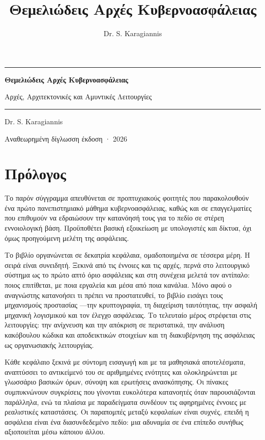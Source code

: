 \documentclass[11pt,openany]{book}
\title{Θεμελιώδεις Αρχές Κυβερνοασφάλειας}
\author{Dr. S. Karagiannis}
\begin{document}
\frontmatter
\begin{titlepage}
  \centering\sffamily
  \vspace*{3cm}
  {\color{accent}\rule{\linewidth}{1.2pt}}\par\vspace{1cm}
  {\Huge\bfseries Θεμελιώδεις Αρχές Κυβερνοασφάλειας\par}
  \vspace{0.6cm}
  {\Large Αρχές, Αρχιτεκτονικές και Αμυντικές Λειτουργίες\par}
  \vspace{1cm}
  {\color{accent}\rule{\linewidth}{1.2pt}}\par
  \vfill
  {\large Dr. S. Karagiannis\par}
  \vspace{0.3cm}
  {\small Αναθεωρημένη δίγλωσση έκδοση · 2026\par}
\end{titlepage}
\tableofcontents
\chapter*{Πρόλογος}

Το παρόν σύγγραμμα απευθύνεται σε προπτυχιακούς φοιτητές που παρακολουθούν ένα πρώτο πανεπιστημιακό μάθημα κυβερνοασφάλειας, καθώς και σε επαγγελματίες που επιθυμούν να εδραιώσουν την κατανόησή τους για το πεδίο σε στέρεη εννοιολογική βάση. Προϋποθέτει βασική εξοικείωση με υπολογιστές και δίκτυα, όχι όμως προηγούμενη μελέτη της ασφάλειας.

Το βιβλίο οργανώνεται σε δεκατρία κεφάλαια, ομαδοποιημένα σε τέσσερα μέρη. Η σειρά είναι συνειδητή. Ξεκινά από τις έννοιες και τις αρχές, περνά στο λειτουργικό σύστημα ως το πρώτο απτό όριο ασφάλειας και στη συνέχεια μελετά τον αντίπαλο: ποιος επιτίθεται, με ποια εργαλεία και μέσα από ποια κανάλια. Μόνο αφού ο αναγνώστης κατανοήσει τι πρέπει να προστατευθεί, το βιβλίο εισάγει τους μηχανισμούς προστασίας —την κρυπτογραφία, τη διαχείριση ταυτότητας, την ασφαλή μηχανική λογισμικού και τον έλεγχο ασφάλειας. Το τελευταίο μέρος στρέφεται στις λειτουργίες: την ανίχνευση και την απόκριση σε περιστατικά, την ανάλυση κακόβουλου κώδικα και αποδεικτικών στοιχείων και τη διακυβέρνηση της ασφάλειας ως οργανωσιακής λειτουργίας.

Κάθε κεφάλαιο ξεκινά με σύντομη εισαγωγή και με τα μαθησιακά αποτελέσματα, αναπτύσσει το αντικείμενό του σε αριθμημένες ενότητες και ολοκληρώνεται με γλωσσάριο βασικών όρων, σύνοψη και ερωτήσεις ανασκόπησης. Οι πίνακες συμπυκνώνουν συγκρίσεις που γίνονται ευκολότερα κατανοητές όταν παρουσιάζονται παράλληλα, ενώ τα πλαίσια με παραδείγματα συνδέουν τις αφηρημένες έννοιες με ρεαλιστικές καταστάσεις. Οι παραπομπές μεταξύ κεφαλαίων είναι συχνές, επειδή η ασφάλεια είναι ένα διασυνδεδεμένο πεδίο: μια αδυναμία σε ένα επίπεδο συνήθως αξιοποιείται μέσω κάποιου άλλου.
\end{document}
